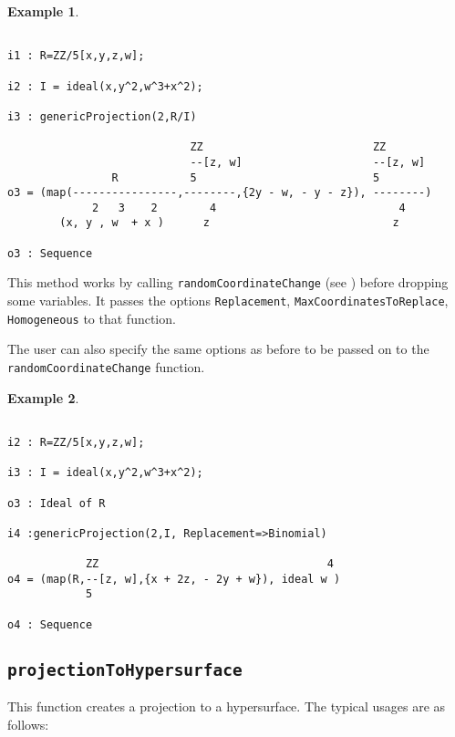 \documentclass[11pt]{amsart}
\theoremstyle{definition}
\newtheorem{example}{Example}[section]
\begin{document}
\begin{example}
	{{\small\color{blue}
	\begin{verbatim}

i1 : R=ZZ/5[x,y,z,w];

i2 : I = ideal(x,y^2,w^3+x^2);

i3 : genericProjection(2,R/I)	

                            ZZ                          ZZ
                            --[z, w]                    --[z, w]                        
                R           5                           5
o3 = (map(----------------,--------,{2y - w, - y - z}), --------)                       
             2   3    2        4                            4
        (x, y , w  + x )      z                            z

o3 : Sequence
	\end{verbatim}
	}}
\end{example}
	

This method works by calling {\tt randomCoordinateChange} (see ) before dropping some variables.  It passes the options {\tt Replacement}, {\tt MaxCoordinatesToReplace}, {\tt Homogeneous} to that function.

The user can also specify the same options as before to be passed on to the {\tt randomCoordinateChange} function.

\begin{example}
	{{\small\color{blue}
	\begin{verbatim}
		
i2 : R=ZZ/5[x,y,z,w];

i3 : I = ideal(x,y^2,w^3+x^2);

o3 : Ideal of R

i4 :genericProjection(2,I, Replacement=>Binomial)

            ZZ                                   4
o4 = (map(R,--[z, w],{x + 2z, - 2y + w}), ideal w )                                     
            5

o4 : Sequence
\end{verbatim}
}}
\end{example}

\subsection{\tt projectionToHypersurface} This function creates a projection to a hypersurface. The typical usages are as follows: 
\end{document}
